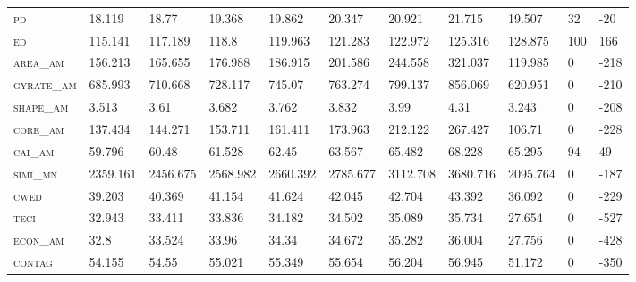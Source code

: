 \begin{landscape}
\begin{table}[!htbp]
\begin{tabular}{@{}lllllllllll@{}}
\small \textsc{pd}              & 18.119        & 18.77        & 19.368          & 19.862         & 20.347         & 20.921          & 21.715          & 19.507        & 32       & -20     \\
\small \textsc{ed}              & 115.141        & 117.189        & 118.8          & 119.963         & 121.283         & 122.972          & 125.316          & 128.875       & 100       & 166     \\
\small \textsc{area\_am}        & 156.213        & 165.655        & 176.988          & 186.915         & 201.586         & 244.558          & 321.037          & 119.985       & 0       & -218     \\
\small \textsc{gyrate\_am}      & 685.993        & 710.668        & 728.117          & 745.07         & 763.274         & 799.137          & 856.069          & 620.951       & 0       & -210     \\
\small \textsc{shape\_am}       & 3.513        & 3.61        & 3.682          & 3.762         & 3.832         & 3.99          & 4.31          & 3.243         & 0       & -208     \\
\small \textsc{core\_am}        & 137.434        & 144.271        & 153.711          & 161.411         & 173.963         & 212.122          & 267.427          & 106.71        & 0       & -228     \\
\small \textsc{cai\_am}         & 59.796        & 60.48        & 61.528          & 62.45         & 63.567         & 65.482          & 68.228          & 65.295        & 94       & 49     \\
\small \textsc{simi\_mn}        & 2359.161        & 2456.675        & 2568.982          & 2660.392         & 2785.677         & 3112.708          & 3680.716          & 2095.764      & 0       & -187     \\
\small \textsc{cwed}            & 39.203        & 40.369        & 41.154          & 41.624         & 42.045         & 42.704          & 43.392          & 36.092        & 0       & -229     \\
\small \textsc{teci}            & 32.943        & 33.411        & 33.836          & 34.182         & 34.502         & 35.089          & 35.734          & 27.654        & 0       & -527     \\
\small \textsc{econ\_am}        & 32.8        & 33.524        & 33.96          & 34.34         & 34.672         & 35.282          & 36.004          & 27.756        & 0       & -428     \\
\small \textsc{contag}          & 54.155        & 54.55        & 55.021          & 55.349         & 55.654         & 56.204          & 56.945          & 51.172        & 0       & -350     \\

\end{tabular}
\end{table}
\end{landscape}
